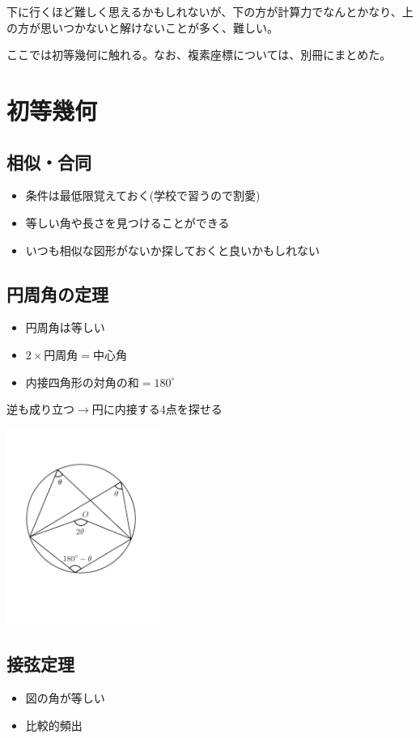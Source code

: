 \documentclass[uplatex,fleqn]{jsbook}
\begin{document}
下に行くほど難しく思えるかもしれないが、下の方が計算力でなんとかなり、上の方が思いつかないと解けないことが多く、難しい。

ここでは初等幾何に触れる。なお、複素座標については、別冊にまとめた。
\section{初等幾何}

\subsection{相似・合同}
\begin{itemize}
    \item 条件は最低限覚えておく(学校で習うので割愛)
    \item 等しい角や長さを見つけることができる
    \item いつも相似な図形がないか探しておくと良いかもしれない
\end{itemize}

\subsection{円周角の定理}

\begin{itemize}
    \item 円周角は等しい
    \item $2\times\text{円周角}=\text{中心角}$
    \item 内接四角形の対角の和$=180^{\circ}$
\end{itemize}

逆も成り立つ$\rightarrow$円に内接する4点を探せる

\includegraphics[clip,width=5cm]{figures/inscribed-angle.pdf}

\subsection{接弦定理}
\begin{itemize}
    \item 図の角が等しい
    \item 比較的頻出
\end{itemize}
\end{document}
